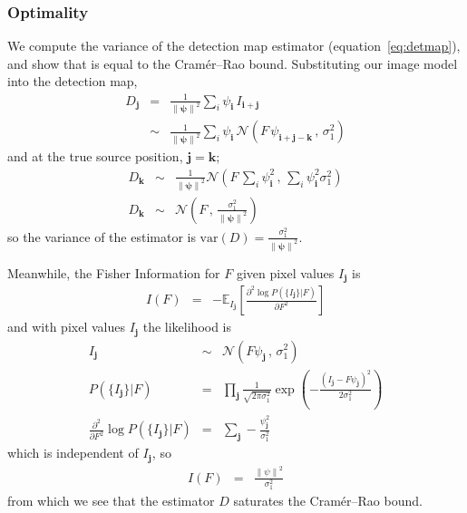 \documentclass[letterpaper,preprint]{aastex62}
\newcommand{\equationname}{equation}
\newcommand{\eqnref}[1]{\mbox{\equationname~\ref{#1}}}
\newcommand{\var}[1]{\mathrm{Var}({#1})}
\newcommand{\drawnfrom}{\sim}
\newcommand{\gaussianN}{\mathcal{N}}
\newcommand{\gaussx}[2]{\gaussianN\!\left(#1 \, , \, #2\right)}
\newcommand{\psf}{\psi}
\newcommand{\psfat}[1]{\psf_{#1}}
\newcommand{\psfnorm}{\norm{\bm{\psf}}}
\newcommand{\norm}[1]{\left\lVert #1 \right\rVert}
\renewcommand{\var}[1]{\mathrm{var}\left( #1 \right)}
\renewcommand{\vec}[1]{\boldsymbol{#1}}
\newcommand{\ivec}{\vec{i}}
\newcommand{\jvec}{\vec{j}}
\newcommand{\kvec}{\vec{k}}
\begin{document}
\subsubsection{Optimality}
\label{sec:optsingle}

We compute the variance of the detection map estimator
(\eqnref{eq:detmap}), and show that is equal to the Cram\'er--Rao
bound.  Substituting our image model into the detection map,
\begin{eqnarray}
D_{\jvec} &=& \frac{1}{\psfnorm^2} \sum_{i} \psfat{\ivec} \,
I_{\ivec + \jvec}
\\
& \drawnfrom & \frac{1}{\psfnorm^2} \sum_{i} \psfat{\ivec} \,
\gaussx{F \, \psfat{\ivec + \jvec - \kvec}}{\sigma_1^2}
\end{eqnarray}
and at the true source position, $\jvec = \kvec$;
\begin{eqnarray}
%
D_{\kvec} &\drawnfrom& \frac{1}{\psfnorm^2} \gaussx%
{F \, \sum_{i} \psfat{\ivec}^2}%
{\sum_{i} \psfat{\ivec}^2 \sigma_1^2}
\\
D_{\kvec} &\drawnfrom& \gaussx%
{F}{\frac{\sigma_1^2}{\psfnorm^2}}
\end{eqnarray}
so the variance of the estimator is $\var{D} = \frac{\sigma_1^2}{\psfnorm^2}$.

Meanwhile, the Fisher Information for $F$ given pixel values $I_{\jvec}$ is
\begin{eqnarray}
  I(F) &=& -\mathbb{E}_{I_{\jvec}} \left[ \frac{\partial^2 \log P(\{ I_{\jvec} \} | F)}{\partial F^2} \right]
\end{eqnarray}
and with pixel values $I_{\jvec}$ the likelihood is
\begin{eqnarray}
  I_{\jvec} &\drawnfrom& \gaussx{F \psf_{\jvec}}{\sigma_1^2} \\
  P(\{ I_{\jvec} \} | F) &=& \prod_{\jvec} \frac{1}{\sqrt{2 \pi \sigma_1^2}} \exp \left( -\frac{(I_{\jvec} - F \psf_{\jvec})^2}{2 \sigma_1^2} \right) \\
  \frac{\partial^2}{\partial F^2} \log P(\{ I_{\jvec} \} | F) &=& \sum_{\jvec} -\frac{\psf_{\jvec}^2}{\sigma_1^2}
\end{eqnarray}
which is independent of $I_{\jvec}$, so
\begin{eqnarray}
  I(F) &=& \frac{\norm{\psf}^2}{\sigma_1^2}
\end{eqnarray}
from which we see that the estimator $D$ saturates the Cram\'er--Rao bound.
\end{document}
